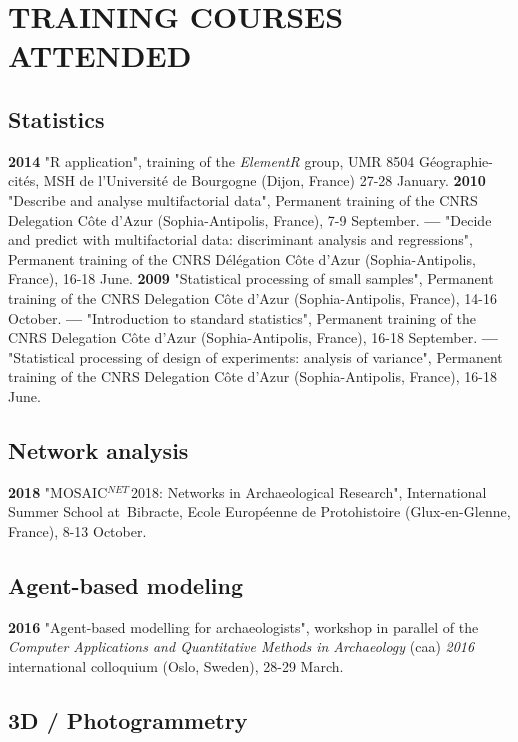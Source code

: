 \documentclass[11pt]{report} %
\begin{document}
\section*{TRAINING COURSES ATTENDED}

\subsection*{Statistics }

\textbf{2014 }"\textsf{R} application", training of the \textit{ElementR} group, UMR 8504 G\'{e}ographie-cit\'{e}s, MSH de l'Universit\'{e} de Bourgogne (Dijon, France) 27-28 January.
\smallbreak
\textbf{2010 }"Describe and analyse multifactorial data", Permanent training of the CNRS Delegation C\^{o}te d'Azur (Sophia-Antipolis, France), 7-9 September.
\smallbreak
\textbf{---  }"Decide and predict with multifactorial data: discriminant analysis and regressions", Permanent training of the CNRS D\'{e}l\'{e}gation C\^{o}te d'Azur (Sophia-Antipolis, France), 16-18 June.
\smallbreak
\textbf{2009 }"Statistical processing of small samples", Permanent training of the CNRS Delegation C\^{o}te d'Azur (Sophia-Antipolis, France), 14-16 October.
\smallbreak
\textbf{---  }"Introduction to standard statistics", Permanent training of the CNRS Delegation C\^{o}te d'Azur (Sophia-Antipolis, France), 16-18 September.
\textbf{---  }"Statistical processing of design of experiments: analysis of variance", Permanent training of the CNRS Delegation C\^{o}te d'Azur (Sophia-Antipolis, France), 16-18 June.
\smallbreak

\subsection*{Network analysis}

\textbf{2018 }"MOSAIC${}^{NET\ }$2018: Networks in Archaeological Research", International Summer School at~Bibracte, Ecole Europ\'{e}enne de Protohistoire (Glux-en-Glenne, France), 8-13 October.

\subsection*{Agent-based modeling}

\textbf{2016 }"Agent-based modelling for archaeologists", workshop in parallel of the \textit{Computer Applications and Quantitative Methods in Archaeology }(caa) \textit{2016 }international colloquium (Oslo, Sweden), 28-29 March.

\subsection*{3D / Photogrammetry}
\end{document}
